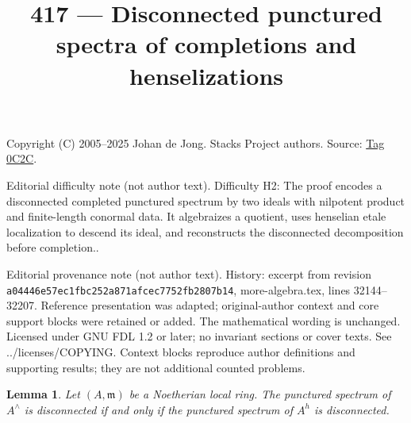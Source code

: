 \documentclass{amsart}
\theoremstyle{plain}
\newtheorem{lemma}[subsection]{Lemma}
\theoremstyle{definition}
\theoremstyle{remark}
\numberwithin{equation}{subsection}
\begin{document}
\title[Stacks Project, Tag 0C2C]{417 --- Disconnected punctured spectra of completions and henselizations}
\maketitle
\noindent Copyright (C) 2005--2025 Johan de Jong. Stacks Project authors. Source: \href{https://stacks.math.columbia.edu/tag/0C2C}{Tag 0C2C}.

\noindent Editorial difficulty note (not author text). Difficulty H2: The proof encodes a disconnected completed punctured spectrum by two ideals with nilpotent product and finite-length conormal data. It algebraizes a quotient, uses henselian etale localization to descend its ideal, and reconstructs the disconnected decomposition before completion..

\noindent Editorial provenance note (not author text). History: excerpt from revision \texttt{a0444\allowbreak 6e57e\allowbreak c1fbc\allowbreak 252a8\allowbreak 71afc\allowbreak ec775\allowbreak 2fb28\allowbreak 07b14}, more-algebra.tex, lines 32144--32207. Reference presentation was adapted; original-author context and core support blocks were retained or added. The mathematical wording is unchanged. Licensed under GNU FDL 1.2 or later; no invariant sections or cover texts. See ../licenses/COPYING. Context blocks reproduce author definitions and supporting results; they are not additional counted problems.

\begin{lemma}
\label{lemma-completion-disconnected}
Let $(A, \mathfrak m)$ be a Noetherian local ring. The punctured spectrum
of $A^\wedge$ is disconnected if and only if the punctured spectrum of $A^h$
is disconnected.
\end{lemma}
\end{document}
